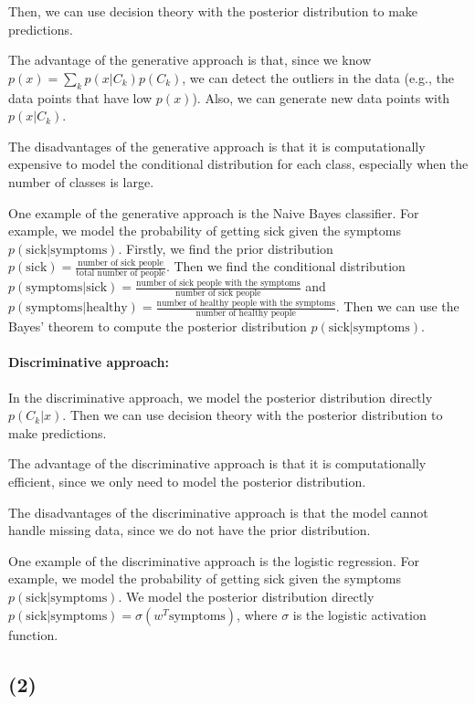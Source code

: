 \documentclass[a4paper,12pt]{article}
\begin{document}
Then, we can use decision theory with the posterior distribution to make predictions.

The advantage of the generative approach is that, since we know $p(x) = \sum_{k} p(x|C_k) p(C_k)$, we can detect the outliers in the data (e.g., the data points that have low $p(x)$). Also, we can generate new data points with $p(x|C_k)$.

The disadvantages of the generative approach is that it is computationally expensive to model the conditional distribution for each class, especially when the number of classes is large.

One example of the generative approach is the Naive Bayes classifier. For example, we model the probability of getting sick given the symptoms $p(\text{sick}|\text{symptoms})$. Firstly, we find the prior distribution $p(\text{sick}) = \frac{\text{number of sick people}}{\text{total number of people}}$. Then we find the conditional distribution $p(\text{symptoms}|\text{sick}) = \frac{\text{number of sick people with the symptoms}}{\text{number of sick people}}$ and $p(\text{symptoms}|\text{healthy}) = \frac{\text{number of healthy people with the symptoms}}{\text{number of healthy people}}$. Then we can use the Bayes' theorem to compute the posterior distribution $p(\text{sick}|\text{symptoms})$.

\paragraph{Discriminative approach:}

In the discriminative approach, we model the posterior distribution directly $p(C_k|x)$. Then we can use decision theory with the posterior distribution to make predictions.

The advantage of the discriminative approach is that it is computationally efficient, since we only need to model the posterior distribution.

The disadvantages of the discriminative approach is that the model cannot handle missing data, since we do not have the prior distribution.

One example of the discriminative approach is the logistic regression. For example, we model the probability of getting sick given the symptoms $p(\text{sick}|\text{symptoms})$. We model the posterior distribution directly $p(\text{sick}|\text{symptoms}) = \sigma(w^T \text{symptoms})$, where $\sigma$ is the logistic activation function.

\subsection*{(2)}
\end{document}
